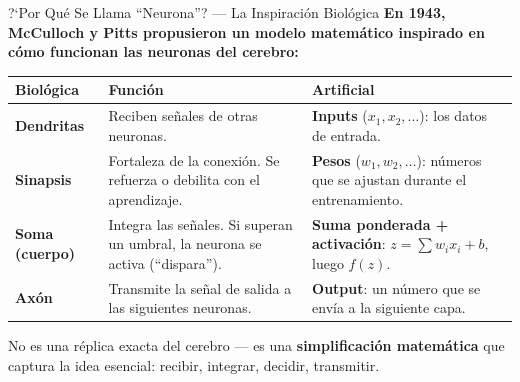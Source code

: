 \documentclass[aspectratio=169, 11pt]{beamer}
\begin{document}
\begin{frame}{?`Por Qu\'e Se Llama ``Neurona''? --- La Inspiraci\'on Biol\'ogica}
  \vspace{-4pt}
  {\footnotesize\color{arcaDark}\bfseries
    En 1943, McCulloch y Pitts propusieron un modelo matem\'atico
    inspirado en c\'omo funcionan las neuronas del cerebro:}

  \vspace{6pt}
  {\scriptsize
  \begin{tabular}{@{}p{2.5cm}p{4.5cm}p{5cm}@{}}
    \toprule
    \textbf{Biol\'ogica} & \textbf{Funci\'on} & \textbf{Artificial} \\
    \midrule
    \textbf{Dendritas} & Reciben se\~nales de otras neuronas. & \textbf{Inputs} ($x_1, x_2, \ldots$): los datos de entrada. \\
    \textbf{Sinapsis} & Fortaleza de la conexi\'on. Se refuerza o debilita con el aprendizaje. & \textbf{Pesos} ($w_1, w_2, \ldots$): n\'umeros que se ajustan durante el entrenamiento. \\
    \textbf{Soma (cuerpo)} & Integra las se\~nales. Si superan un umbral, la neurona se activa (``dispara''). & \textbf{Suma ponderada + activaci\'on}: $z = \sum w_i x_i + b$, luego $f(z)$. \\
    \textbf{Ax\'on} & Transmite la se\~nal de salida a las siguientes neuronas. & \textbf{Output}: un n\'umero que se env\'ia a la siguiente capa. \\
    \bottomrule
  \end{tabular}
  }

  \vspace{6pt}
  {\scriptsize\color{textMuted}
    \faLightbulb\hspace{4pt} No es una r\'eplica exacta del cerebro ---
    es una \textbf{simplificaci\'on matem\'atica} que captura la idea
    esencial: recibir, integrar, decidir, transmitir.}
\end{frame}
\end{document}
